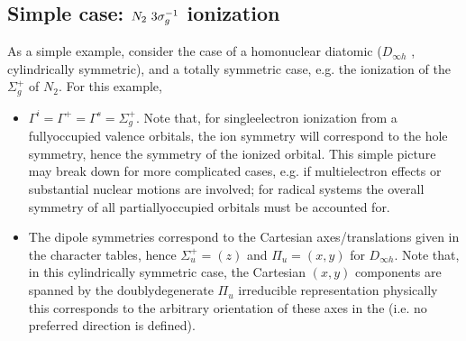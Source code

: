\documentclass[letterpaper,table,10pt,english]{jupyterBook}
\begin{document}
\subsection{Simple case: \protect\(N_2~3\sigma_g^{-1}\protect\) ionization}
\label{\detokenize{part2/sym-fitting-intro_240723:simple-case-n-2-3-sigma-g-1-ionization}}
\sphinxAtStartPar
As a simple example, consider the case of a homonuclear diatomic (\(D_{\infty h}\) {\hyperref[\detokenize{backmatter/glossary:term-PG}]{}}, cylindrically symmetric), and a totally symmetric case, e.g. the ionization of the \(\Sigma_{g}^{+}\) {\hyperref[\detokenize{backmatter/glossary:term-HOMO}]{}} of \(N_2\). For this example,
\begin{itemize}
\item {} 
\sphinxAtStartPar
\(\Gamma^{i} = \Gamma^{+} = \Gamma^{s} = \Sigma_{g}^{+}\). Note that, for single\sphinxhyphen{}electron ionization from a fully\sphinxhyphen{}occupied valence orbitals, the ion symmetry will correspond to the hole symmetry, hence the symmetry of the ionized orbital. This simple picture may break down for more complicated cases, e.g. if multi\sphinxhyphen{}electron effects or substantial nuclear motions are involved; for radical systems the overall symmetry of all partially\sphinxhyphen{}occupied orbitals must be accounted for.

\item {} 
\sphinxAtStartPar
The dipole symmetries correspond to the Cartesian axes/translations given in the character tables, hence \(\Sigma_{u}^{+} = (z)\) and \(\Pi_{u} = (x,y)\) for \(D_{\infty h}\). Note that, in this cylindrically symmetric case, the Cartesian \((x,y)\) components are spanned by the doubly\sphinxhyphen{}degenerate \(\Pi_{u}\) irreducible representation \sphinxhyphen{} physically this corresponds to the arbitrary orientation of these axes in the {\hyperref[\detokenize{backmatter/glossary:term-MF}]{}} (i.e. no preferred direction is defined).

\end{itemize}
\end{document}
